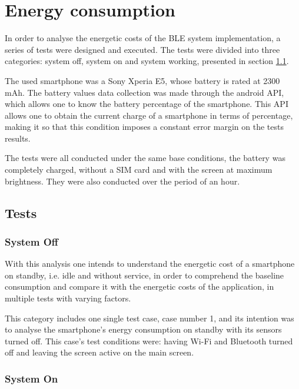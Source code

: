 \section{Energy consumption}  
\label{sec:energetic}  
  
  
In order to analyse the energetic costs of the \ac{BLE} system implementation, a series of tests were designed and executed. The tests were divided into three categories: system off, system on and system working, presented in section \ref{subsec:tests}.  
  
 
 
The used smartphone was a Sony Xperia E5, whose battery is rated at 2300 mAh. The battery values data collection was made through the android API, which allows one to know the battery percentage of the smartphone. This API allows one to obtain the current charge of a smartphone in terms of percentage, making it so that this condition imposes a constant error margin on the tests results.   
  
  
The tests were all conducted under the same base conditions, the battery was completely charged, without a SIM card and with the screen at maximum brightness. They were also conducted over the period of an hour.  
  
  
\subsection{Tests}  
\label{subsec:tests}  
  
  
\subsubsection{System Off}  
\label{subsec:sysoff}  
  
  
With this analysis one intends to understand the energetic cost of a smartphone on standby, i.e. idle and without service, in order to comprehend the baseline consumption and compare it with the energetic costs of the application, in multiple tests with varying factors.  
  
  
This category includes one single test case, case number 1, and its intention was to analyse the smartphone's energy consumption on standby with its sensors turned off. This case's test conditions were: having Wi-Fi and Bluetooth turned off and leaving the screen active on the main screen.  
  
  
\subsubsection{System On}  
\label{subsec:syson}  
  
